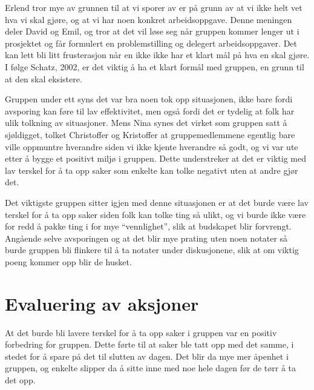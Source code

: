 Erlend tror mye av grunnen til at vi sporer av er på grunn av at vi ikke helt vet hva vi skal gjøre, og at vi har noen konkret 
arbeidsoppgave. Denne meningen deler David og Emil, og tror at det vil løse seg når gruppen kommer lenger ut i prosjektet og får 
formulert en problemstilling og delegert arbeidsoppgaver. Det kan lett bli litt frusterasjon når en ikke ikke har et klart mål på hva en 
skal gjøre. I følge Schatz, 2002, er det viktig å ha et klart formål med gruppen, en grunn til at den skal eksistere.

Gruppen under ett syns det var bra noen tok opp situasjonen, ikke bare fordi avsporing kan føre til lav effektivitet, men også fordi det 
er tydelig at folk har ulik tolkning av situasjoner. Mens Nina synes det virket som gruppen satt å sjøldigget, tolket Christoffer og 
Kristoffer at gruppemedlemmene egentlig bare ville oppmuntre hverandre siden vi ikke kjente hverandre så godt, og vi var ute etter å 
bygge et positivt miljø i gruppen. Dette understreker at det er viktig med lav terskel for å ta opp saker som enkelte kan tolke negativt 
uten at andre gjør det.

Det viktigste gruppen sitter igjen med denne situasjonen er at det burde være lav terskel for å ta opp saker siden folk kan tolke ting så 
ulikt, og vi burde ikke være for redd å pakke ting i for mye ``vennlighet'', slik at budskapet blir forvrengt. Angående selve avsporingen 
og at det blir mye prating uten noen notater så burde gruppen bli flinkere til å ta notater under diskusjonene, slik at om viktig poeng 
kommer opp blir de husket.

\section{Evaluering av aksjoner}
At det burde bli lavere terskel for å ta opp saker i gruppen var en positiv forbedring for gruppen. Dette førte til at saker ble tatt opp 
med det samme, i stedet for å spare på det til slutten av dagen. Det blir da mye mer åpenhet i gruppen, og enkelte slipper da å sitte 
inne med noe hele dagen før de tørr å ta det opp.

